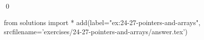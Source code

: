 
\begin{ex}
  \label{ex:24-27-pointers-and-arrays}
  
  \qed
\end{ex}
\begin{python0}
from solutions import *
add(label="ex:24-27-pointers-and-arrays",
    srcfilename='exercises/24-27-pointers-and-arrays/answer.tex')
\end{python0}
